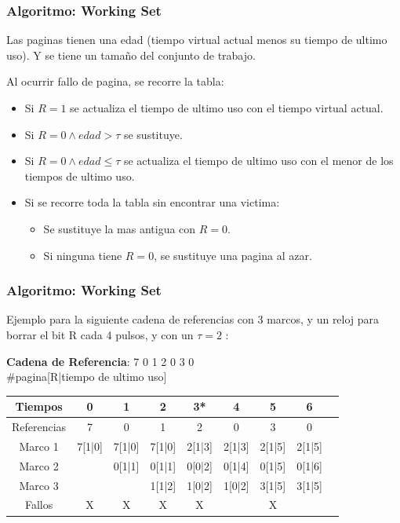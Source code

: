 \documentclass{beamer}
\newcommand{\algTitle}{\textbf{Algoritmo:} }
\begin{document}
\begin{frame}
	\frametitle{\algTitle Working Set}
	
	Las paginas tienen una edad (tiempo virtual actual menos su tiempo de ultimo uso). Y se tiene un tamaño del conjunto de trabajo.
	
	Al ocurrir fallo de pagina, se recorre la tabla:
	\begin{itemize}
		\item Si $R = 1$ se actualiza el tiempo de ultimo uso con el tiempo virtual actual.
		\item Si $R = 0 \land edad > \tau$ se sustituye.
		\item Si $R = 0 \land edad \leq \tau$ se actualiza el tiempo de ultimo uso con el menor de los tiempos de ultimo uso.
		\item Si se recorre toda la tabla sin encontrar una victima: 
			\begin{itemize}
				\item Se sustituye la mas antigua con $R = 0$.
				\item Si ninguna tiene $R = 0$, se sustituye una pagina al azar.
			\end{itemize}
	\end{itemize}
	
\end{frame}

\begin{frame}
	\frametitle{\algTitle Working Set}
	
	Ejemplo para la siguiente cadena de referencias con 3 marcos, y un reloj para borrar el bit R cada 4 pulsos, y con un $\tau = 2$ :
	
	\begin{table}[h]
		{\textbf{Cadena de Referencia}: 7 0 1 2 0 3 0} \\
		\footnotesize \#pagina[R|tiempo de ultimo uso]
		\begin{tabular}{|c||c|c|c|c|c|c|c|c|}
			\hline
			Tiempos     & 0      & 1      & 2      & 3*     & 4      & 5      & 6      \\ \hline
			Referencias & 7      & 0      & 1      & 2      & 0      & 3      & 0      \\ \hline \hline
			Marco 1     & 7[1|0] & 7[1|0] & 7[1|0] & 2[1|3] & 2[1|3] & 2[1|5] & 2[1|5] \\ \hline
			Marco 2     &        & 0[1|1] & 0[1|1] & 0[0|2] & 0[1|4] & 0[1|5] & 0[1|6] \\ \hline
			Marco 3     &        &        & 1[1|2] & 1[0|2] & 1[0|2] & 3[1|5] & 3[1|5] \\ \hline
			Fallos      & X      & X      & X      & X      &        & X      &        \\ \hline
		\end{tabular}
	\end{table}
\end{frame}
\end{document}
